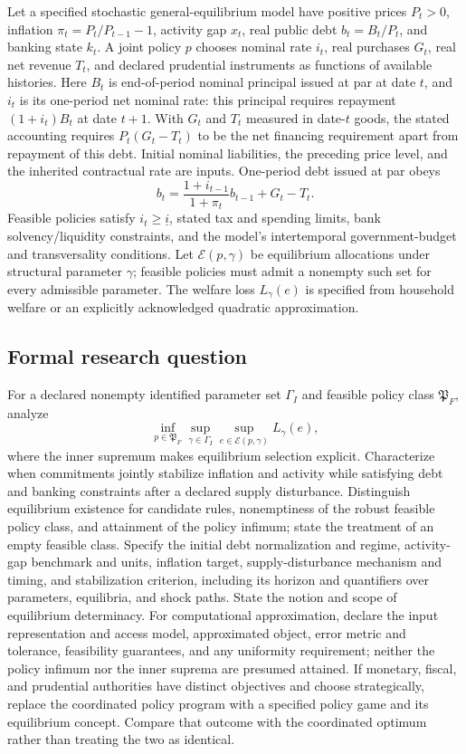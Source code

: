 \documentclass[11pt,a4paper]{article}
\begin{document}
Let a specified stochastic general-equilibrium model have positive prices $P_t>0$, inflation $\pi_t=P_t/P_{t-1}-1$, activity gap $x_t$, real public debt $b_t=B_t/P_t$, and banking state $k_t$. A joint policy $p$ chooses nominal rate $i_t$, real purchases $G_t$, real net revenue $T_t$, and declared prudential instruments as functions of available histories. Here $B_t$ is end-of-period nominal principal issued at par at date $t$, and $i_t$ is its one-period net nominal rate: this principal requires repayment $(1+i_t)B_t$ at date $t+1$. With $G_t$ and $T_t$ measured in date-$t$ goods, the stated accounting requires $P_t(G_t-T_t)$ to be the net financing requirement apart from repayment of this debt. Initial nominal liabilities, the preceding price level, and the inherited contractual rate are inputs. One-period debt issued at par obeys
\[
b_t=\frac{1+i_{t-1}}{1+\pi_t}b_{t-1}+G_t-T_t.
\]
Feasible policies satisfy $i_t\ge\underline i$, stated tax and spending limits, bank solvency/liquidity constraints, and the model's intertemporal government-budget and transversality conditions. Let $\mathcal E(p,\gamma)$ be equilibrium allocations under structural parameter $\gamma$; feasible policies must admit a nonempty such set for every admissible parameter. The welfare loss $L_\gamma(e)$ is specified from household welfare or an explicitly acknowledged quadratic approximation.

\subsection*{Formal research question}

For a declared nonempty identified parameter set $\Gamma_I$ and feasible policy class $\mathfrak P_F$, analyze
\[
\inf_{p\in\mathfrak P_F}\sup_{\gamma\in\Gamma_I}
 \sup_{e\in\mathcal E(p,\gamma)}L_\gamma(e),
\]
where the inner supremum makes equilibrium selection explicit. Characterize when commitments jointly stabilize inflation and activity while satisfying debt and banking constraints after a declared supply disturbance. Distinguish equilibrium existence for candidate rules, nonemptiness of the robust feasible policy class, and attainment of the policy infimum; state the treatment of an empty feasible class. Specify the initial debt normalization and regime, activity-gap benchmark and units, inflation target, supply-disturbance mechanism and timing, and stabilization criterion, including its horizon and quantifiers over parameters, equilibria, and shock paths. State the notion and scope of equilibrium determinacy. For computational approximation, declare the input representation and access model, approximated object, error metric and tolerance, feasibility guarantees, and any uniformity requirement; neither the policy infimum nor the inner suprema are presumed attained. If monetary, fiscal, and prudential authorities have distinct objectives and choose strategically, replace the coordinated policy program with a specified policy game and its equilibrium concept. Compare that outcome with the coordinated optimum rather than treating the two as identical.
\end{document}
